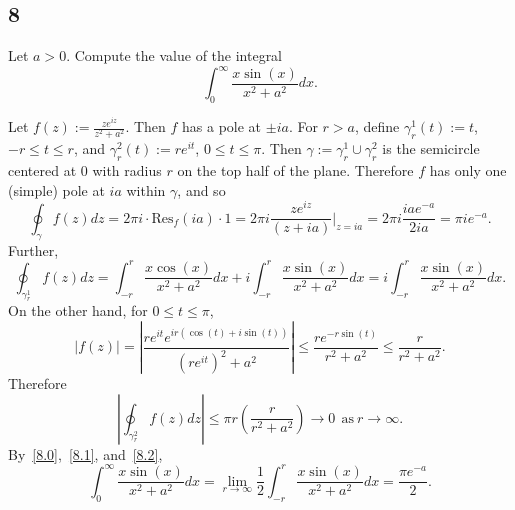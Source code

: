 \documentclass[12pt]{article}
\begin{document}
\subsection*{8}
\begin{tcolorbox}
Let $a > 0$. Compute the value of the integral
\[ \int_{0}^{\infty}\frac{x\sin(x)}{x^2 + a^2}dx. \]
\end{tcolorbox}
Let $f(z) := \frac{ze^{iz}}{z^{2} + a^{2}}$. Then $f$ has a pole at $\pm ia$. For $r > a$, define $\gamma_{r}^{1}(t) := t$, $-r \leq t \leq r$, and
$\gamma_{r}^{2}(t) := re^{it}$, $0 \leq t \leq \pi$. Then $\gamma := \gamma_{r}^{1} \cup \gamma_{r}^{2}$ is the semicircle centered at 0 with radius
$r$ on the top half of the plane. Therefore $f$ has only one (simple) pole at $ia$ within $\gamma$, and so
\begin{equation}
\oint_{\gamma}f(z)dz = 2\pi i \cdot \text{Res}_{f}(ia)\cdot 1 = 2\pi i \frac{ze^{iz}}{(z + ia)}\bigg|_{z=ia} = 2\pi i\frac{ia e^{-a}}{2ia} = \pi i
e^{-a}.
\label{8.0}
\end{equation}
Further,
\begin{equation}
\oint_{\gamma_{r}^{1}}f(z)dz = \int_{-r}^{r}\frac{x\cos(x)}{x^{2} + a^{2}}dx + i \int_{-r}^{r}\frac{x\sin(x)}{x^{2} + a^{2}}dx =
i\int_{-r}^{r}\frac{x\sin(x)}{x^{2} + a^{2}}dx.
\label{8.1}
\end{equation}
On the other hand, for $0 \leq t \leq \pi$,
\[ |f(z)| = \left|\frac{re^{it}e^{ir(\cos(t) + i\sin(t))}}{(re^{it})^{2} + a^{2}}\right| \leq \frac{re^{-r\sin(t)}}{r^{2} + a^{2}} \leq \frac{r}{r^{2}
+ a^{2}}. \]
Therefore
\begin{equation}
\left| \oint_{\gamma_{r}^{2}}f(z)dz \right| \leq \pi r\left( \frac{r}{r^{2} + a^{2}} \right) \rightarrow 0 \ \ \text{as}\  r\rightarrow \infty.
\label{8.2}
\end{equation}
By~\eqref{8.0},~\eqref{8.1}, and~\eqref{8.2},
\[ \int_{0}^{\infty}\frac{x\sin(x)}{x^{2} + a^{2}}dx = \lim_{r\rightarrow\infty}\frac{1}{2}\int_{-r}^{r}\frac{x\sin(x)}{x^{2} + a^{2}}dx = \frac{\pi
e^{-a}}{2}. \]

\newpage
\end{document}
